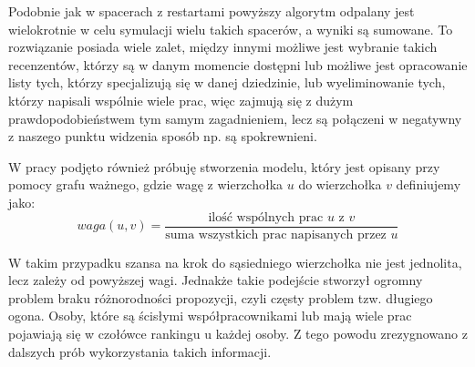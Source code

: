 Podobnie jak w spacerach z restartami powyższy algorytm odpalany jest wielokrotnie w celu symulacji wielu takich spacerów, a wyniki są sumowane. To rozwiązanie posiada wiele zalet, między innymi możliwe jest wybranie takich recenzentów, którzy są w danym momencie dostępni lub możliwe jest opracowanie listy tych, którzy specjalizują się w danej dziedzinie, lub wyeliminowanie tych, którzy napisali wspólnie wiele prac, więc zajmują się z dużym prawdopodobieństwem tym samym zagadnieniem, lecz są połączeni w negatywny z naszego punktu widzenia sposób np. są spokrewnieni.


W pracy podjęto również próbuję stworzenia modelu, który jest opisany przy pomocy grafu ważnego, gdzie wagę z wierzchołka $u$ do wierzchołka $v$ definiujemy jako:
\begin{equation*}
   waga(u,v)=\frac{\text{ilość wspólnych prac $u$ z $v$}}{\text{suma wszystkich prac napisanych przez $u$}}
\end{equation*}

W takim przypadku szansa na krok do sąsiedniego wierzchołka nie jest jednolita, lecz zależy od powyższej wagi. Jednakże takie podejście stworzył ogromny problem braku różnorodności propozycji, czyli częsty problem tzw. długiego ogona. Osoby, które są ścisłymi współpracownikami lub mają wiele prac pojawiają się w czołówce rankingu u każdej osoby. Z tego powodu zrezygnowano z dalszych prób wykorzystania takich informacji.